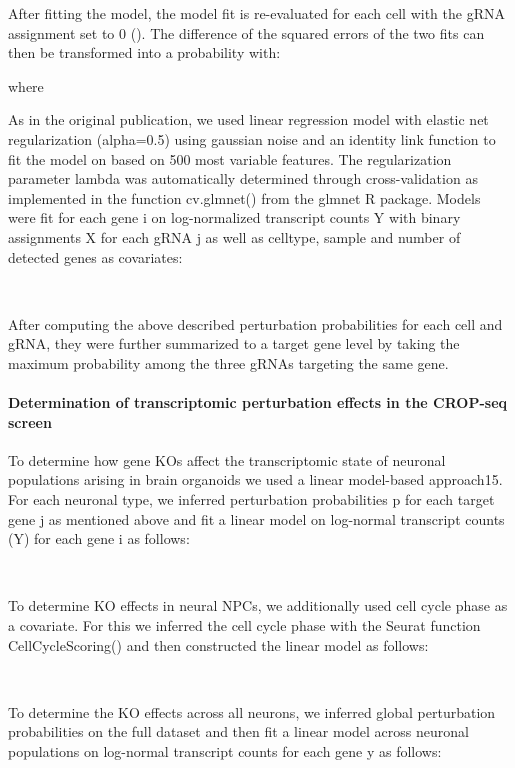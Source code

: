  
After fitting the model, the model fit is re-evaluated for each cell with the gRNA assignment set to 0 (). The difference of the squared errors of the two fits can then be transformed into a probability with:
 
             
 
            where  
 
As in the original publication, we used linear regression model with elastic net regularization (alpha=0.5) using gaussian noise and an identity link function to fit the model on  based on 500 most variable features. The regularization parameter lambda was automatically determined through cross-validation as implemented in the function  cv.glmnet() from the glmnet R package. Models were fit for each gene i on log-normalized transcript counts Y with binary assignments X for each gRNA j as well as celltype, sample and number of detected genes as covariates:
 
             ~
 
After computing the above described perturbation probabilities for each cell and gRNA, they were further summarized to a target gene level by taking the maximum probability among the three gRNAs targeting the same gene.
 
 
\paragraph{Determination of transcriptomic perturbation effects in the CROP-seq screen}
To determine how gene KOs affect the transcriptomic state of neuronal populations arising in brain organoids we used a linear model-based approach15. For each neuronal type, we inferred perturbation probabilities p for each target gene j as mentioned above  and fit a linear model on log-normal transcript counts (Y) for each gene i as follows:
 
             ~
 
To determine KO effects in neural NPCs, we additionally used cell cycle phase as a covariate. For this we inferred the cell cycle phase with the Seurat function CellCycleScoring() and then constructed the linear model as follows:
 
             ~
 
To determine the KO effects across all neurons, we inferred global perturbation probabilities on the full dataset and then fit a linear model across neuronal populations on log-normal transcript counts for each gene y as follows:
 
            ~
 
